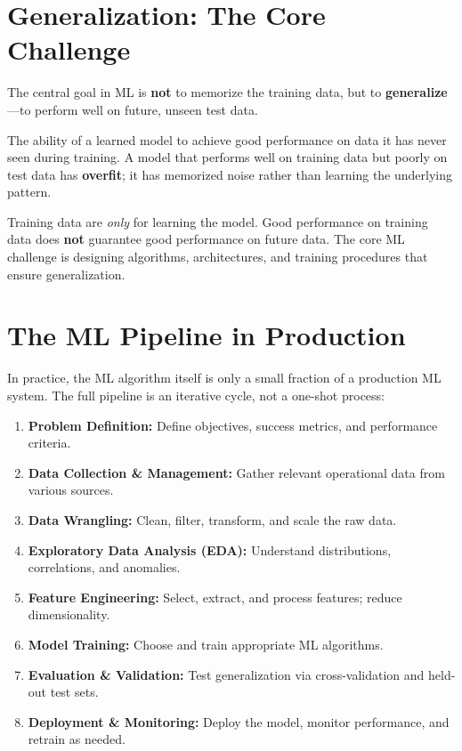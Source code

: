 \section*{Generalization: The Core Challenge}

The central goal in ML is \textbf{not} to memorize the training data, but to \textbf{generalize}---to perform well on future, unseen test data.

\begin{definition}[Generalization]
The ability of a learned model to achieve good performance on data it has never seen during training. A model that performs well on training data but poorly on test data has \textbf{overfit}; it has memorized noise rather than learning the underlying pattern.
\end{definition}

\begin{remark}
Training data are \textit{only} for learning the model. Good performance on training data does \textbf{not} guarantee good performance on future data. The core ML challenge is designing algorithms, architectures, and training procedures that ensure generalization.
\end{remark}

\section*{The ML Pipeline in Production}

In practice, the ML algorithm itself is only a small fraction of a production ML system. The full pipeline is an iterative cycle, not a one-shot process:

\begin{enumerate}
    \item \textbf{Problem Definition:} Define objectives, success metrics, and performance criteria.
    \item \textbf{Data Collection \& Management:} Gather relevant operational data from various sources.
    \item \textbf{Data Wrangling:} Clean, filter, transform, and scale the raw data.
    \item \textbf{Exploratory Data Analysis (EDA):} Understand distributions, correlations, and anomalies.
    \item \textbf{Feature Engineering:} Select, extract, and process features; reduce dimensionality.
    \item \textbf{Model Training:} Choose and train appropriate ML algorithms.
    \item \textbf{Evaluation \& Validation:} Test generalization via cross-validation and held-out test sets.
    \item \textbf{Deployment \& Monitoring:} Deploy the model, monitor performance, and retrain as needed.
\end{enumerate}

